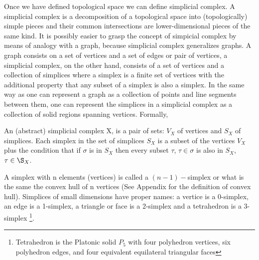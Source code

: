 \documentclass[onecollarge,runningheads]{svjour2}
\begin{document}

Once we have defined topological space we can define simplicial complex. A simplicial complex is a decomposition of a topological space into (topologically) simple pieces and their common intersections are lower-dimensional pieces of the same kind. It is possibly easier to grasp the concept of simpicial complex by means of analogy with a graph, because  simplicial complex generalizes graphs.
A graph consists on a set of vertices and a set of edges or pair of vertices, a simplicial complex, on the other hand, consists of a set of vertices and a collection of simplices where a simplex is a finite set of vertices with the additional property that any subset of a simplex is also a simplex. In the same way as one can represent a graph as a collection of points and line segments between them, one can represent the simplices in a simplicial complex as a collection of solid regions spanning vertices. Formally, 

\begin{definition}
An (abstract) simplicial complex X, is a pair of sets: $V_X$ of vertices and $S_X$ of simplices. Each simplex in the set of simplices $S_X$ is a subset of the vertices $V_X$ plus the condition that if $\sigma$ is in $S_X$ then every subset $\tau$, $\tau \in \sigma$ is also in $S_X$, $\tau \in \S_X$. 
\end{definition}

A simplex with n elements (vertices) is called a $(n-1)-$simplex or what is the same the convex hull of n vertices (See Appendix for the definition of convex hull). Simplices of small dimensions have proper names: a vertice is a 0-simplex, an edge is a 1-simplex, a triangle or face is a 2-simplex and a tetrahedron is a 3-simplex \footnote{Tetrahedron is the Platonic solid $P_5$ with four polyhedron vertices, six polyhedron edges, and four equivalent equilateral triangular faces}. 
\end{document}
